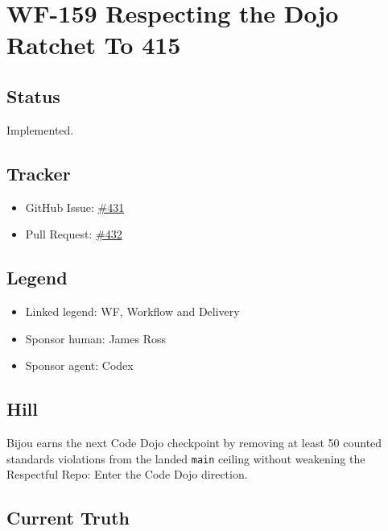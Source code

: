 \chapter{WF-159 Respecting the Dojo Ratchet To 415}\label{record-241}

\smallskip

\section{Status}\label{record-241-status}

Implemented.

\section{Tracker}\label{record-241-tracker}

\begin{itemize}
\tightlist
\item
  GitHub Issue: \href{https://github.com/flyingrobots/bijou/issues/431}{\#431}
\item
  Pull Request: \href{https://github.com/flyingrobots/bijou/pull/432}{\#432}
\end{itemize}

\section{Legend}\label{record-241-legend}

\begin{itemize}
\tightlist
\item
  Linked legend: WF, Workflow and Delivery
\item
  Sponsor human: James Ross
\item
  Sponsor agent: Codex
\end{itemize}

\section{Hill}\label{record-241-hill}

Bijou earns the next Code Dojo checkpoint by removing at least 50 counted standards violations from the landed \texttt{m\allowbreak{}a\allowbreak{}i\allowbreak{}n} ceiling without weakening the Respectful Repo: Enter the Code Dojo direction.

\section{Current Truth}\label{record-241-current-truth}

